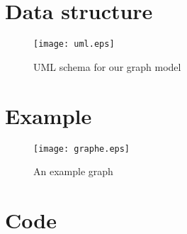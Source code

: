 \documentclass[a4paper,12pt]{article}
\begin{document}
\tableofcontents
\listoffigures

\section{Data structure}

\begin{figure}[h]
  \center
  \texttt{[image: uml.eps]}
  \caption{\label{fig:uml} UML schema for our graph model}
\end{figure}

\section{Example}

\begin{figure}[h]
  \center
  \texttt{[image: graphe.eps]}
  \caption{\label{fig:graphe} An example graph}
\end{figure}

\section{Code}



\appendix

\end{document}
